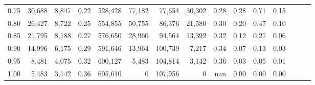 \begin{tabular}{rrrrrrrrrrrrrrr}
0.75 &  30,688 &  8,847 &  0.22 &  528,428 &   77,182 &   77,654 &   30,302 &  0.28 &  0.28 &  0.71 &      0.15 \\
0.80 &  26,427 &  8,722 &  0.25 &  554,855 &   50,755 &   86,376 &   21,580 &  0.30 &  0.20 &  0.47 &      0.10 \\
0.85 &  21,795 &  8,188 &  0.27 &  576,650 &   28,960 &   94,564 &   13,392 &  0.32 &  0.12 &  0.27 &      0.06 \\
0.90 &  14,996 &  6,175 &  0.29 &  591,646 &   13,964 &  100,739 &    7,217 &  0.34 &  0.07 &  0.13 &      0.03 \\
0.95 &   8,481 &  4,075 &  0.32 &  600,127 &    5,483 &  104,814 &    3,142 &  0.36 &  0.03 &  0.05 &      0.01 \\
1.00 &   5,483 &  3,142 &  0.36 &  605,610 &        0 &  107,956 &        0 &   nan &  0.00 &  0.00 &      0.00 \\
\bottomrule
\end{tabular}
